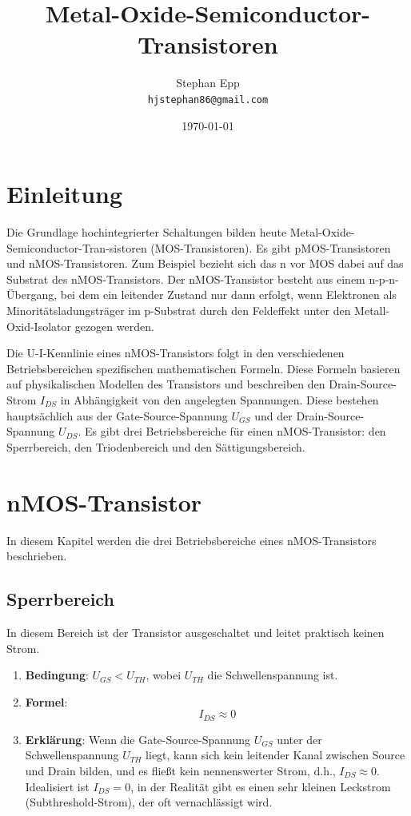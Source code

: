 \documentclass{scrarticle}
\title{Metal-Oxide-Semiconductor-Transistoren}
\author{Stephan Epp\\\texttt{hjstephan86@gmail.com}}
\date{\today}
\numberwithin{equation}{section}
\begin{document}
	\maketitle
	\vspace{5em}
	\tableofcontents
	\newpage

\section{Einleitung}
Die Grundlage hochintegrierter Schaltungen bilden heute Metal-Oxide-Semiconductor-Tran-sistoren (MOS-Transistoren). Es gibt pMOS-Transistoren und nMOS-Transistoren. Zum Beispiel bezieht sich das n vor MOS dabei auf das Substrat des nMOS-Transistors. Der nMOS-Transistor besteht aus einem n-p-n-Übergang, bei dem ein leitender Zustand nur dann erfolgt, wenn Elektronen als Minoritätsladungsträger im p-Substrat durch den Feldeffekt unter den Metall-Oxid-Isolator gezogen werden.

Die U-I-Kennlinie eines nMOS-Transistors folgt in den verschiedenen Betriebsbereichen spezifischen mathematischen Formeln. Diese Formeln basieren auf physikalischen Modellen des Transistors und beschreiben den Drain-Source-Strom $I_{DS}$ in Abhängigkeit von den angelegten Spannungen. Diese bestehen hauptsächlich aus der Gate-Source-Spannung $U_{GS}$ und der Drain-Source-Spannung $U_{DS}$. Es gibt drei Betriebsbereiche für einen nMOS-Transistor: den Sperrbereich, den Triodenbereich und den Sättigungsbereich.

\section{nMOS-Transistor}
In diesem Kapitel werden die drei Betriebsbereiche eines nMOS-Transistors beschrieben.
\subsection{Sperrbereich}
In diesem Bereich ist der Transistor ausgeschaltet und leitet praktisch keinen Strom.

\begin{enumerate}
	\renewcommand{\labelenumi}{} %
	\item \textbf{Bedingung}: $U_{GS} < U_{TH}$, wobei $U_{TH}$ die Schwellenspannung ist.
	\item \textbf{Formel}:
	\begin{equation*}
		I_{DS} \approx 0
	\end{equation*}
	\item \textbf{Erklärung}: Wenn die Gate-Source-Spannung $U_{GS}$ unter der Schwellenspannung $U_{TH}$ liegt, kann sich kein leitender Kanal zwischen Source und Drain bilden, und es fließt kein nennenswerter Strom, d.h., $I_{DS} \approx 0$. Idealisiert ist $I_{DS} = 0$, in der Realität gibt es einen sehr kleinen Leckstrom (Subthreshold-Strom), der oft vernachlässigt wird.
\end{enumerate}
\end{document}
